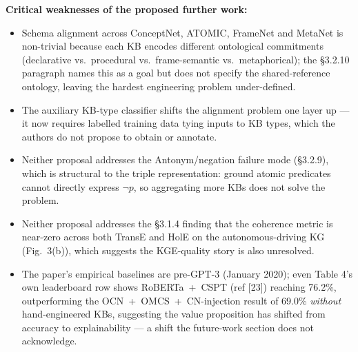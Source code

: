 \documentclass[11pt, a4paper]{article}
\begin{document}
\textbf{Critical weaknesses of the proposed further work:}
\begin{itemize}
  \item Schema alignment across ConceptNet, ATOMIC, FrameNet and MetaNet is non-trivial because each KB encodes different ontological commitments (declarative vs.\ procedural vs.\ frame-semantic vs.\ metaphorical); the §3.2.10 paragraph names this as a goal but does not specify the shared-reference ontology, leaving the hardest engineering problem under-defined.
  \item The auxiliary KB-type classifier shifts the alignment problem one layer up — it now requires labelled training data tying inputs to KB types, which the authors do not propose to obtain or annotate.
  \item Neither proposal addresses the Antonym/negation failure mode (§3.2.9), which is structural to the triple representation: ground atomic predicates cannot directly express \(\neg p\), so aggregating more KBs does not solve the problem.
  \item Neither proposal addresses the §3.1.4 finding that the coherence metric is near-zero across both TransE and HolE on the autonomous-driving KG (Fig.\ 3(b)), which suggests the KGE-quality story is also unresolved.
  \item The paper's empirical baselines are pre-GPT-3 (January 2020); even Table 4's own leaderboard row shows RoBERTa~+~CSPT (ref [23]) reaching 76.2\%, outperforming the OCN~+~OMCS~+~CN-injection result of 69.0\% \emph{without} hand-engineered KBs, suggesting the value proposition has shifted from accuracy to explainability — a shift the future-work section does not acknowledge.
\end{itemize}
\end{document}
